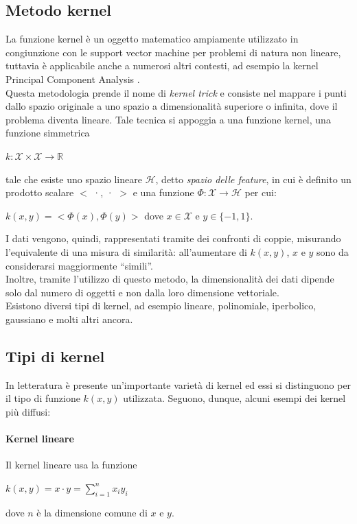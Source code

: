 \documentclass[12pt]{report}
\theoremstyle{definition}
\begin{document}
\subsection{Metodo kernel} \label{kernel}
La funzione kernel è un oggetto matematico ampiamente utilizzato in congiunzione con le support vector machine \cite{28} per problemi di natura non lineare, tuttavia è applicabile anche a numerosi altri contesti, ad esempio la kernel Principal Component Analysis \cite{29}.
\\
Questa metodologia prende il nome di \textit{kernel trick} e consiste nel mappare i punti dallo spazio originale a uno spazio a dimensionalità superiore o infinita, dove il problema diventa lineare.
Tale tecnica si appoggia a una funzione kernel, una funzione simmetrica 
\begin{center}
    $k: \mathcal{X} \times \mathcal{X} \rightarrow \mathbb{R}$
\end{center} 
tale che esiste uno spazio lineare $\mathcal{H}$, detto \textit{spazio delle feature}, in cui è definito un prodotto scalare $<$ ·, · $>$ e una funzione $\mathit{\Phi }: \mathcal{X} \rightarrow \mathcal{H}$ per cui:
\begin{center}
    $k(x,y) = <\mathit{\Phi}(x), \mathit{\Phi}(y)>$ dove $x \in \mathcal{X}$ e $y \in \{-1,1\}$.
\end{center}
I dati vengono, quindi, rappresentati tramite dei confronti di coppie, misurando l'equivalente di una misura di similarità: all'aumentare di $k(x,y)$, $x$ e $y$ sono da considerarsi maggiormente  ``simili''.
\\
Inoltre, tramite l'utilizzo di questo metodo, la dimensionalità dei dati dipende solo dal numero di oggetti e non dalla loro dimensione vettoriale.
\\
Esistono diversi tipi di kernel, ad esempio lineare, polinomiale, iperbolico, gaussiano e molti altri ancora.

\subsection{Tipi di kernel}
In letteratura è presente un'importante varietà di kernel ed essi si distinguono per il tipo di funzione $k(x,y)$ utilizzata. Seguono, dunque, alcuni esempi dei kernel più diffusi:

\paragraph{Kernel lineare}
Il kernel lineare usa la funzione
\begin{center}
    $k(x,y) = x \cdot y = \sum\limits_{i=1}^n x_iy_i$
\end{center}
dove $n$ è la dimensione comune di $x$ e $y$.
\end{document}
